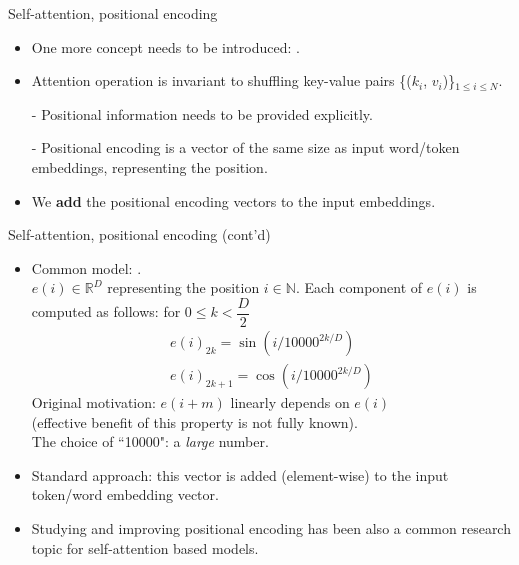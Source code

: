 \begin{frame}{Self-attention, positional encoding}
\vspace{-4mm}
\begin{itemize}
\item One more concept needs to be introduced: .
\item Attention operation is invariant to shuffling key-value pairs \{($k_i$, $v_i$)\}$_{1 \leq i \leq N}$.
\item[-] Positional information needs to be provided explicitly.
\item[-] Positional encoding is a vector of the same size as input word/token embeddings,
representing the position.
\item We \textbf{add} the positional encoding vectors to the input embeddings.
\end{itemize}
\end{frame}

\begin{frame}{Self-attention, positional encoding (cont'd)}
\begin{itemize}
\item Common model: .\\ $e(i) \in \mathbb{R}^D$ representing the position $i \in \mathbb{N}$. Each component of $e(i)$ is computed as follows: for $0 \leq k < \dfrac{D}{2}$
                \begin{eqnarray*}
                        e(i)_{2k} = \sin(i/10000^{2k/D}) \\
                        e(i)_{2k+1} = \cos(i/10000^{2k/D})
                \end{eqnarray*}
\pause
Original motivation: $e(i+m)$ linearly depends on $e(i)$ \\(effective benefit of this property is not fully known).\\
The choice of ``10000": a \textit{large} number.
\pause
\item Standard approach: this vector is added (element-wise) to the input token/word embedding vector.
\pause
\item Studying and improving positional encoding has been also a common research topic
for self-attention based models.
\end{itemize}
\end{frame}

